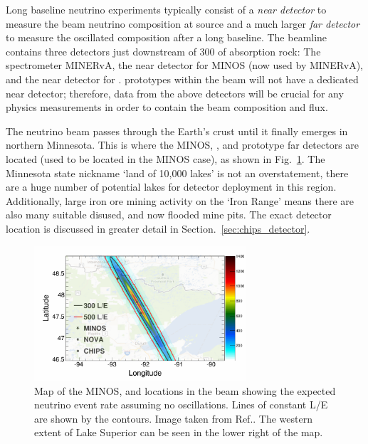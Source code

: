 Long baseline neutrino experiments typically consist of a \emph{near detector} to measure the beam
neutrino composition at source and a much larger \emph{far detector} to measure the oscillated
composition after a long baseline. The \numi beamline contains three detectors just downstream of
\unit{300}{} of absorption rock: The spectrometer MINERvA, the near detector for MINOS
(now used by MINERvA), and the near detector for \nova. \chips prototypes within the \numi beam
will not have a dedicated near detector; therefore, data from the above detectors will be crucial
for any physics measurements in order to contain the beam composition and flux.

The \numi neutrino beam passes through the Earth's crust until it finally emerges in northern
Minnesota. This is where the MINOS, \nova, and prototype \chips far detectors are located (used to
be located in the MINOS case), as shown in Fig.~\ref{fig:numi_map}. The Minnesota state nickname
`land of 10,000 lakes' is not an overstatement, there are a huge number of potential lakes for
\chips detector deployment in this region. Additionally, large iron ore mining activity on the
`Iron Range' means there are also many suitable disused, and now flooded mine pits. The exact
\chipsfive detector location is discussed in greater detail in Section.~\ref{sec:chips_detector}.

\begin{figure} %
    \includegraphics[width=0.7\textwidth]{diagrams/4-chips/numi_map.png}
    \caption[Map of detector locations in the \numi beam.]
    {Map of the MINOS, \nova and \chips locations in the \numi beam showing the expected neutrino
        event rate assuming no oscillations. Lines of constant L/E are shown by the contours.
        Image taken from Ref.\cite{adamson2013}. The western extent of Lake Superior can be seen
        in the lower right of the map.}
    \label{fig:numi_map}
\end{figure}

